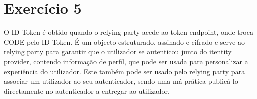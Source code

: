 \documentclass[11pt]{report}
\begin{document}
\section{Exercício 5}
	O ID Token é obtido quando o relying party acede ao token endpoint, onde troca CODE pelo ID Token.
	É um objecto estruturado, assinado e cifrado e serve ao relying party para garantir que o utilizador se autenticou junto do itentity provider, contendo informação de perfil, que pode ser usada para personalizar a experiência do utilizador.
	Este também pode ser usado pelo relying party para associar um utilizador ao seu autenticador, sendo uma má prática publicá-lo directamente no autenticador a entregar ao utilizador.

\newpage
\end{document}
